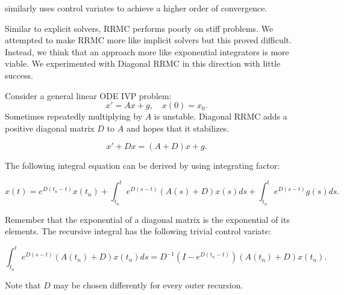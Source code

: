 \documentclass[a4paper,12pt]{article}
\begin{document}
\begin{related}[CV RRMC]
    \cite{daun_randomized_2011} similarly uses control variates to achieve
    a higher order of convergence.
\end{related}

Similar to explicit solvers, RRMC performs poorly on stiff problems.
We attempted to make RRMC more like implicit solvers but this proved difficult.
Instead, we think that an approach more like exponential integrators
is more viable. We experimented with Diagonal RRMC in this direction with
little success.

\begin{definition} \label{def:DRRMC}
    Consider a general linear ODE IVP problem:
    \begin{equation}
        x' = Ax+g, \quad x(0)= x_{0}.
    \end{equation}
    Sometimes repeatedly multiplying by $A$ is unstable.
    Diagonal RRMC adds a positive diagonal matrix $D$
    to $A$ and hopes that it stabilizes.

    \begin{equation}
        x' + Dx = (A+D)x+g.
    \end{equation}

    The following integral equation can be derived by using integrating factor:

    \begin{equation}\label{eq:int eq DRRMC}
        x(t)= e^{D(t_{n}-t)}x(t_{n}) + \int_{t_{n}}^{t} e^{D(s-t)}(A(s)+D)x(s)ds+\int_{t_{n}}^{t} e^{D(s-t)}g(s)ds.
    \end{equation}

    Remember that the exponential of a diagonal matrix is the exponential of its elements.
    The recursive integral has the following trivial control variate:

    \begin{equation}\label{eq: CV DRRMC}
        \int_{t_{n}}^{t}  e^{D(s-t)}(A(t_{n})+D)x(t_{n})ds = D^{-1}(I-e^{D(t_{n}-t)})(A(t_{n})+D)x(t_{n}).
    \end{equation}

    Note that $D$ may be chosen differently for every outer recursion.
\end{definition}
\end{document}
